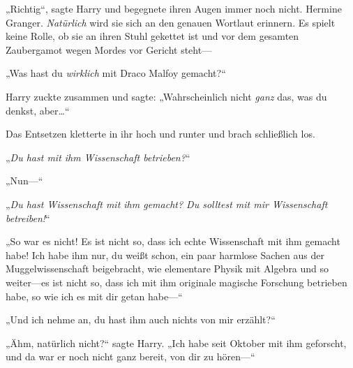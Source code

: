 „Richtig“, sagte Harry und begegnete ihren Augen immer noch nicht.
Hermine Granger. \emph{Natürlich} wird sie sich an den genauen Wortlaut erinnern. Es spielt keine Rolle, ob sie an ihren Stuhl gekettet ist und vor dem gesamten Zaubergamot wegen Mordes vor Gericht steht—

„Was hast du \emph{wirklich} mit Draco Malfoy gemacht?“

Harry zuckte zusammen und sagte: „Wahrscheinlich nicht \emph{ganz} das, was du denkst, aber…“

Das Entsetzen kletterte in ihr hoch und runter und brach schließlich los.

„\emph{Du hast mit ihm \emph{Wissenschaft} betrieben?}“

„Nun—“

„\emph{Du hast \emph{Wissenschaft} mit ihm gemacht? Du solltest mit \emph{mir} Wissenschaft betreiben!}“

„So war es nicht! Es ist nicht so, dass ich echte Wissenschaft mit ihm gemacht habe! Ich habe ihm nur, du weißt schon, ein paar harmlose Sachen aus der Muggelwissenschaft beigebracht, wie elementare Physik mit Algebra und so weiter—es ist nicht so, dass ich mit ihm originale magische Forschung betrieben habe, so wie ich es mit dir getan habe—“

„Und ich nehme an, du hast ihm auch nichts von mir erzählt?“

„Ähm, natürlich nicht?“ sagte Harry. „Ich habe seit Oktober mit ihm geforscht, und da war er noch nicht ganz bereit, von dir zu hören—“


